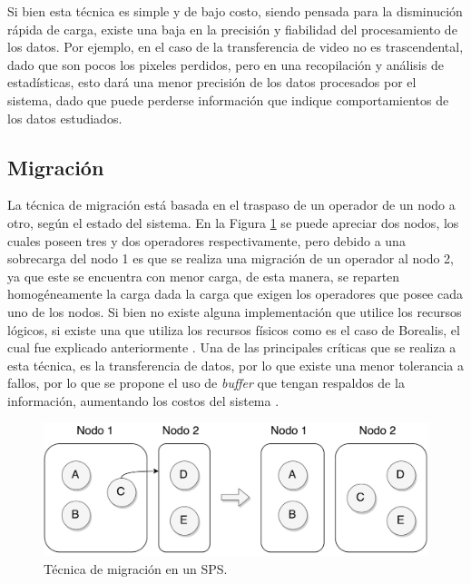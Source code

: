 Si bien esta técnica es simple y de bajo costo, siendo pensada para la disminución rápida de carga, existe una baja en la precisión y fiabilidad del procesamiento de los datos. Por ejemplo, en el caso de la transferencia de video no es trascendental, dado que son pocos los pixeles perdidos, pero en una recopilación y análisis de estadísticas, esto dará una menor precisión de los datos procesados por el sistema, dado que puede perderse información que indique comportamientos de los datos estudiados.

\subsection{Migración}
\label{sec:migracionBC}

La técnica de migración está basada en el traspaso de un operador de un nodo a otro, según el estado del sistema. En la Figura \ref{fig:migracion} se puede apreciar dos nodos, los cuales poseen tres y dos operadores respectivamente, pero debido a una sobrecarga del nodo 1 es que se realiza una migración de un operador al nodo 2, ya que este se encuentra con menor carga, de esta manera, se reparten homogéneamente la carga dada la carga que exigen los operadores que posee cada uno de los nodos. Si bien no existe alguna implementación que utilice los recursos lógicos, si existe una que utiliza los recursos físicos como es el caso de Borealis, el cual fue explicado anteriormente \citep{XingZH05}. Una de las principales críticas que se realiza a esta técnica, es la transferencia de datos, por lo que existe una menor tolerancia a fallos, por lo que se propone el uso de \textit{buffer} que tengan respaldos de la información, aumentando los costos del sistema \citep{PittauACA07}.

\begin{figure}[!ht]
	\centering
	\includegraphics[scale=0.45]{images/Migracion.pdf}
	\caption{Técnica de migración en un SPS.}
	\label{fig:migracion}
\end{figure}

